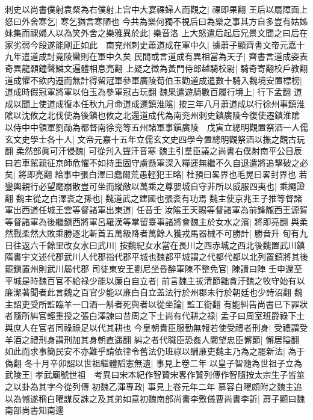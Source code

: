刺史以尚書僕射袁粲為右僕射上宫中大宴祼婦人而觀之|{
	祼即果翻}
王后以扇障面上怒曰外舍寒乞|{
	寒乞猶言寒陋也}
今共為樂何獨不視后曰為樂之事其方自多豈有姑姊妹集而祼婦人以為笑外舍之樂雅異於此|{
	樂音洛}
上大怒遣后起后兄景文聞之曰后在家劣弱今段遂能剛正如此　南兖州刺史蕭道成在軍中久|{
	據蕭子顯齊書文帝元嘉十九年遣道成討竟陵蠻則在軍中久矣}
民間或言道成有異相當為天子|{
	齊書言道成姿表奇異龍顙鐘聲鱗文遍體相息亮翻}
上疑之徵為黃門侍郎越騎校尉|{
	騎奇寄翻校戶教翻}
道成懼不欲内遷而無計得留冠軍參軍廣陵荀伯玉勸道成遣數十騎入魏境安置標榜|{
	道成時假冠軍將軍以伯玉為參軍冠古玩翻}
魏果遣遊騎數百履行境上|{
	行下孟翻}
道成以聞上使道成復本任秋九月命道成遷鎮淮隂|{
	按三年八月蕭道成以行徐州事鎮淮隂以沈攸之北伐使為後鎮也攸之北還道成代為南兖州刺史鎮廣陵今復使遷鎮淮隂}
以侍中中領軍劉勔為都督南徐兖等五州諸軍事鎭廣陵　戊寅立總明觀置祭酒一人儒玄文史學士各十人|{
	文帝元嘉十五年立儒玄文史四學今置總明觀祭酒以撫之觀古玩翻}
柔然部眞可汗侵魏|{
	可從刋入聲汗音寒}
魏主引羣臣議之尚書右僕射南平公目辰曰若車駕親征京師危懼不如持重固守虜懸軍深入糧運無繼不久自退遣將追擊破之必矣|{
	將即亮翻}
給事中張白澤曰蠢爾荒愚輕犯王略|{
	杜預曰畧界也毛晃曰畧封界也}
若鑾輿親行必望麾崩散豈可坐而縱敵以萬乘之尊嬰城自守非所以威服四夷也|{
	乘繩證翻}
魏主從之白澤衮之孫也|{
	魏道武之建國也張衮有功焉}
魏主使京兆王子推等督諸軍出西道任城王雲等督諸軍出東道|{
	任音壬}
汝隂王天賜等督諸軍為前鋒隴西王源賀等督諸軍為後繼鎭西將軍呂羅漢等掌留臺事諸將會魏主於女水之濱|{
	將即亮翻}
與柔然戰柔然大敗乘勝逐北斬首五萬級降者萬餘人獲戎馬器械不可勝計|{
	勝音升}
旬有九日往返六千餘里改女水曰武川|{
	按魏紀女水當在長川之西赤城之西北後魏置武川鎮隋書宇文述代郡武川人代郡指代郡平城也魏都平城謂之代都代都以北列置鎮將其後罷鎭置州則武川屬代郡}
司徒東安王劉尼坐昏醉軍陳不整免官|{
	陳讀曰陣}
壬申還至平城是時魏百官不給禄少能以廉白自立者|{
	前言魏主拔清節黜貪汙魏之牧守始有以廉潔著聞者此言魏之百官少能以亷白自立盖法行於州郡未行於朝廷也少詩沼翻}
魏主詔吏受所監臨羊一口酒一斛者死與者以從坐論|{
	監工銜翻}
有能糾告尚書已下罪狀者隨所糾官輕重授之張白澤諫曰昔周之下士尚有代耕之禄|{
	孟子曰周室班爵祿下士與庶人在官者同祿祿足以代其耕也}
今皇朝貴臣服勤無報若使受禮者刑身|{
	受禮謂受羊酒之禮刑身謂刑加其身朝直遥翻}
糾之者代職臣恐姦人闚望忠臣懈節|{
	懈居隘翻}
如此而求事簡民安不亦難乎請依律令舊法仍班祿以酬亷吏魏主乃為之罷新法|{
	為于偽翻}
冬十月辛卯詔以世祖繼體䧟憲無遺|{
	事見上卷二年}
以皇子智隨為世祖子立為武陵王|{
	孝武廟號世祖　考異曰宋本紀作智贊宋畧作贊列傳作智隨按太宗生子皆筮之以卦為其字今從列傳}
初魏乙渾專政|{
	事見上卷元年二年}
慕容白曜頗附之魏主追以為憾遂稱白曜謀反誅之及其弟如意初魏南部尚書李敷儀曹尚書李訢|{
	蕭子顯曰魏南部尚書知南邊}


